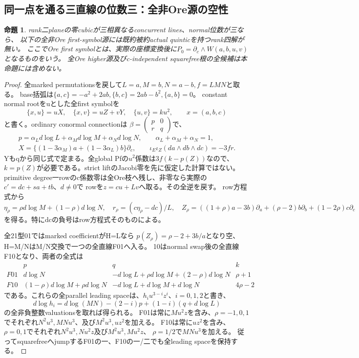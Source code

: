 \documentclass[a4paper,11pt]{ltjsarticle}
\newtheorem{proposition}{命題}[section]
\theoremstyle{definition}
\begin{document}
\subsection{同一点を通る三直線の位数三：全非Ore源の空性}
\begin{proposition}\label{prop:plane-concurrent-m3-nonore-empty}
rank二planeの零cubicが三相異なるconcurrent lines、normal位数が三なら、
以下の全非Ore first-symbol源には既約被約actual quinticを持つrank四解が無い。
ここでOre first symbolとは、実際の座標変換後に$P_0=\partial_c\wedge W(a,b,u,v)$となるものをいう。
全Ore higher源及びc-independent squarefree根の全候補は本命題には含めない。
\end{proposition}
\begin{proof}
全marked permutationsを戻して$L=a,M=b,N=a-b,f=LMN$と取る。
base括弧は$\{a,c\}=-a^2+2ab,\{b,c\}=2ab-b^2,\{a,b\}=0$。
constant normal rootをuとした全first symbolを
\[
 \{x,u\}=uX,\quad \{x,v\}=uZ+vY,\quad
 \{u,v\}=ku^2,\qquad x=(a,b,c)
\]
と書く。ordinary conormal connectionは
$\beta=\left(\begin{smallmatrix}p&0\\r&q\end{smallmatrix}\right)$で、
\[
\begin{gathered}
 p=\alpha_Ld\log L+\alpha_Md\log M+\alpha_Nd\log N,
 \qquad\alpha_L+\alpha_M+\alpha_N=1,\\
 X=\{(1-3\alpha_M)a+(1-3\alpha_L)b\}\partial_c,
 \qquad\iota_E\iota_Z(da\wedge db\wedge dc)=-3fr.
\end{gathered}
\]
Yもqから同じ式で定まる。全global Pfの$u^2$係数は$3f(k-p(Z))$なので、
$k=p(Z)$が必要である。strict liftのJacobi零を先に仮定した計算ではない。
primitive degree一rowのc係数零は全Ore枝へ残し、非零なら実際の$c'=d c+s a+t b$、$d\ne0$で
rowを$z=cu+Lv$へ取る。その全逆を戻す。
row方程式から
\[
 \eta_\rho=\rho d\log M+(1-\rho)d\log N,\quad
 r_\rho=(c\eta_\rho-dc)/L,\quad
 Z_\rho=((1+\rho)a-3b)\partial_a+(\rho-2)b\partial_b+(1-2\rho)c\partial_c
\]
を得る。特にdcの負号はrow方程式そのものによる。

全21型01ではmarked coefficientがH=Lなら
$p(Z_\rho)=\rho-2+3b/a$となり空、H=M/NはM/N交換で一つの全直線F01へ入る。
10はnormal swap後の全直線F10となり、両者の全式は
\[
\begin{array}{c|c|c|c}
 &p&q&k\\\hline
 F01&d\log N&-d\log L+\rho d\log M+(2-\rho)d\log N&\rho+1\\
 F10&(1-\rho)d\log M+\rho d\log N&-d\log L+d\log M+d\log N&4\rho-2
\end{array}
\]
である。これらの全parallel leading spaceは、$h_i u^{3-i}z^i$、$i=0,1,2$と書き、
\[
 d\log h_i=d\log(MN)-(2-i)p+(1-i)(q+d\log L)
\]
の全非負整数valuationsを取れば得られる。
F01は常に$Mu^2z$を含み、$\rho=-1,0,1$でそれぞれ$N^2u^3,MNu^3$、及び$M^2u^3,uz^2$を加える。
F10は常に$uz^2$を含み、$\rho=0,1$でそれぞれ$N^2u^3,Nu^2z$及び$M^2u^3,Mu^2z$、
$\rho=1/2$で$MNu^3$を加える。
従ってsquarefreeへjumpするF01の一、F10の一/二でも全leading spaceを保持する。


\end{proof}
\end{document}
